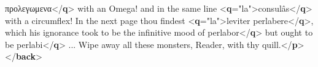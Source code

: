 \begin{shaded}
\hspace*{1em}προλεγωμενα{</\textbf{q}>} with an Omega!\mbox{}\newline 
\hspace*{1em}\hspace*{1em}\hspace*{1em}\hspace*{1em} and in the same line {<\textbf{q}\hspace*{1em}{xml:lang}="{la}">}consulâs{</\textbf{q}>} with a circumflex!\mbox{}\newline 
\hspace*{1em}\hspace*{1em}\hspace*{1em}\hspace*{1em} In the next page thou findest {<\textbf{q}\hspace*{1em}{xml:lang}="{la}">}leviter perlabere{</\textbf{q}>},\mbox{}\newline 
\hspace*{1em}\hspace*{1em}\hspace*{1em}\hspace*{1em} which his ignorance took to be the infinitive mood of\mbox{}\newline 
\hspace*{1em}perlabor{</\textbf{q}>} but ought to be\mbox{}\newline 
\hspace*{1em}perlabi{</\textbf{q}>} ... Wipe away all these\mbox{}\newline 
\hspace*{1em}\hspace*{1em}\hspace*{1em}\hspace*{1em} monsters, Reader, with thy quill.{</\textbf{p}>}\mbox{}\newline 
{}\mbox{}\newline 
{</\textbf{back}>}\end{shaded}\egroup\par \noindent   
